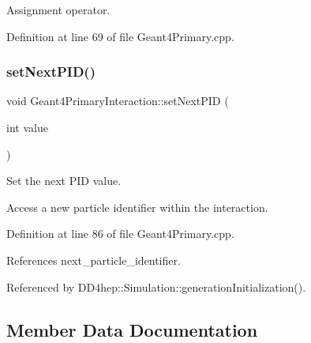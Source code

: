 Assignment operator. 



Definition at line 69 of file Geant4\+Primary.\+cpp.

\hypertarget{class_d_d4hep_1_1_simulation_1_1_geant4_primary_interaction_a18973191ce0e16877f95654c4ee56a30}{}\label{class_d_d4hep_1_1_simulation_1_1_geant4_primary_interaction_a18973191ce0e16877f95654c4ee56a30} 
\subsubsection{\texorpdfstring{set\+Next\+P\+I\+D()}{setNextPID()}}
{\footnotesize\ttfamily void Geant4\+Primary\+Interaction\+::set\+Next\+P\+ID (\begin{DoxyParamCaption}\item[{int}]{value }\end{DoxyParamCaption})}



Set the next P\+ID value. 

Access a new particle identifier within the interaction. 

Definition at line 86 of file Geant4\+Primary.\+cpp.



References next\+\_\+particle\+\_\+identifier.



Referenced by D\+D4hep\+::\+Simulation\+::generation\+Initialization().



\subsection{Member Data Documentation}
\hypertarget{class_d_d4hep_1_1_simulation_1_1_geant4_primary_interaction_a5b906f3249844ff63ea285eb633003d8}{}\label{class_d_d4hep_1_1_simulation_1_1_geant4_primary_interaction_a5b906f3249844ff63ea285eb633003d8} 
